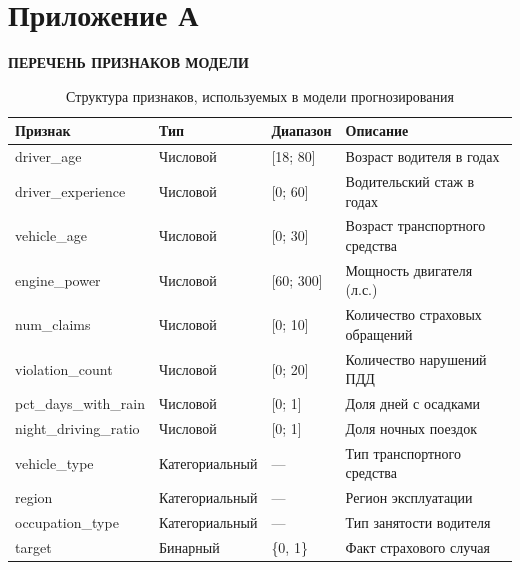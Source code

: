 
\appendix
\renewcommand{\thesection}{Приложение~\Asbuk{section}}

\newpage
\section*{Приложение А}
\label{app:features}
\begin{center}
\textbf{ПЕРЕЧЕНЬ ПРИЗНАКОВ МОДЕЛИ}
\end{center}

\vspace{1cm}

\begin{table}[h]
\centering
\caption{Структура признаков, используемых в модели прогнозирования}
\label{tab:features}
\begin{tabular}{|l|l|l|p{6cm}|}
\hline
\textbf{Признак} & \textbf{Тип} & \textbf{Диапазон} & \textbf{Описание} \\
\hline
driver\_age & Числовой & [18; 80] & Возраст водителя в годах \\
\hline
driver\_experience & Числовой & [0; 60] & Водительский стаж в годах \\
\hline
vehicle\_age & Числовой & [0; 30] & Возраст транспортного средства \\
\hline
engine\_power & Числовой & [60; 300] & Мощность двигателя (л.с.) \\
\hline
num\_claims & Числовой & [0; 10] & Количество страховых обращений \\
\hline
violation\_count & Числовой & [0; 20] & Количество нарушений ПДД \\
\hline
pct\_days\_with\_rain & Числовой & [0; 1] & Доля дней с осадками \\
\hline
night\_driving\_ratio & Числовой & [0; 1] & Доля ночных поездок \\
\hline
vehicle\_type & Категориальный & --- & Тип транспортного средства \\
\hline
region & Категориальный & --- & Регион эксплуатации \\
\hline
occupation\_type & Категориальный & --- & Тип занятости водителя \\
\hline
target & Бинарный & \{0, 1\} & Факт страхового случая \\
\hline
\end{tabular}
\end{table}

